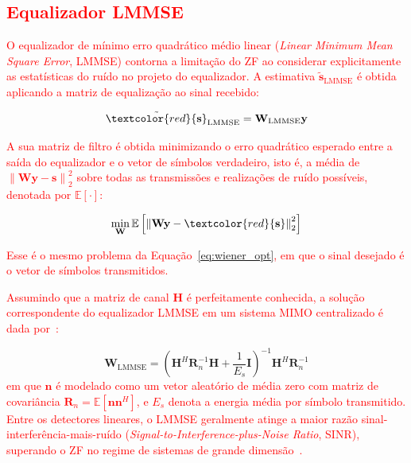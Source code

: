\subsection{\texorpdfstring{\textcolor{red}{Equalizador LMMSE}}{Equalizador LMMSE}}

\textcolor{red}{O equalizador de mínimo erro quadrático médio linear (\textit{Linear Minimum Mean Square Error}, LMMSE) contorna a limitação do ZF ao considerar explicitamente as estatísticas do ruído no projeto do equalizador. A estimativa $\tilde{\mathbf{s}}_\text{LMMSE}$ é obtida aplicando a matriz de equalização ao sinal recebido:}

\begin{equation}
\tilde{\textcolor{red}{\mathbf{s}}}_\text{LMMSE}=
\mathbf{W}_\text{LMMSE}\mathbf{y}
\label{eq:lmmse_estimate}
\end{equation}


\textcolor{red}{A sua matriz de filtro é obtida minimizando o erro quadrático esperado entre a saída do equalizador e o vetor de símbolos verdadeiro, isto é, a média de $\left\|\mathbf{W}\mathbf{y}-\mathbf{s}\right\|_2^2$ sobre todas as transmissões e realizações de ruído possíveis, denotada por $\mathbb{E}\left[\cdot\right]$:}

\begin{equation}
\min_{\mathbf{W}}
\mathbb{E}
\left[
\left\|\mathbf{W}\mathbf{y}-\textcolor{red}{\mathbf{s}}\right\|_2^2
\right]
\label{eq:lmmse_opt}
\end{equation}

\textcolor{red}{Esse é o mesmo problema da Equação~{\hypersetup{linkcolor=red}\eqref{eq:wiener_opt}}, em que o sinal desejado é o vetor de símbolos transmitidos.}


\textcolor{red}{Assumindo que a matriz de canal $\mathbf{H}$ é perfeitamente conhecida, a solução correspondente do equalizador LMMSE em um sistema MIMO centralizado é dada por~\cite{zhao2025jsac}:}

\begin{equation}
\mathbf{W}_\text{LMMSE}=
\left(
\mathbf{H}^H\mathbf{R}_n^{-1}\mathbf{H}
+
\frac{1}{E_s}\mathbf{I}
\right)^{-1}
\mathbf{H}^H\mathbf{R}_n^{-1}
\label{eq:lmmse_solution}
\end{equation}
\textcolor{red}{em que $\mathbf{n}$ é modelado como um vetor aleatório de média zero com matriz de covariância $\mathbf{R}_n = \mathbb{E}[\mathbf{n}\mathbf{n}^H]$, e $E_s$ denota a energia média por símbolo transmitido. Entre os detectores lineares, o LMMSE geralmente atinge a maior razão sinal-interferência-mais-ruído (\textit{Signal-to-Interference-plus-Noise Ratio}, SINR), superando o ZF no regime de sistemas de grande dimensão~\cite{jeon2019}.}


